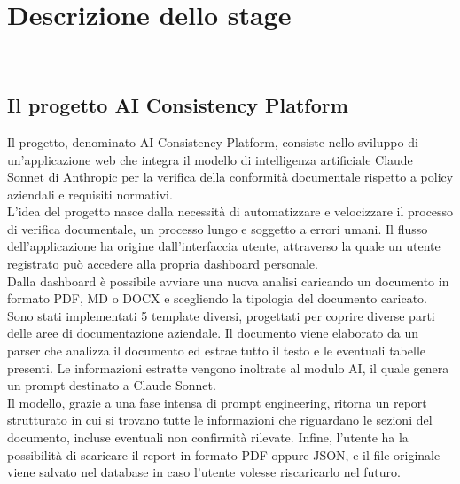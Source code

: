 \chapter{Descrizione dello stage}
\label{cap:descrizione-stage}

\\

\section{Il progetto AI Consistency Platform}
Il progetto, denominato AI Consistency Platform, consiste nello sviluppo di un'applicazione web che integra il modello di intelligenza artificiale Claude Sonnet di Anthropic per la verifica della conformità documentale rispetto a policy aziendali e requisiti normativi. \\
L'idea del progetto nasce dalla necessità di automatizzare e velocizzare il processo di verifica documentale, un processo lungo e soggetto a errori umani.
Il flusso dell'applicazione ha origine dall'interfaccia utente, attraverso la quale un utente registrato può accedere alla propria dashboard personale. \\
Dalla dashboard è possibile avviare una nuova analisi caricando un documento in formato PDF, MD o DOCX e scegliendo la tipologia del documento caricato. Sono stati implementati 5 template diversi, progettati per coprire diverse parti delle aree di documentazione aziendale. 
Il documento viene elaborato da un parser che analizza il documento ed estrae tutto il testo e le eventuali tabelle presenti. Le informazioni estratte vengono inoltrate al modulo AI, il quale genera un prompt destinato a Claude Sonnet. \\
Il modello, grazie a una fase intensa di prompt engineering, ritorna un report strutturato in cui si trovano tutte le informazioni che riguardano le sezioni del documento, incluse eventuali non confirmità rilevate.
Infine, l'utente ha la possibilità di scaricare il report in formato PDF oppure JSON, e il file originale viene salvato nel database in caso l'utente volesse riscaricarlo nel futuro. 

